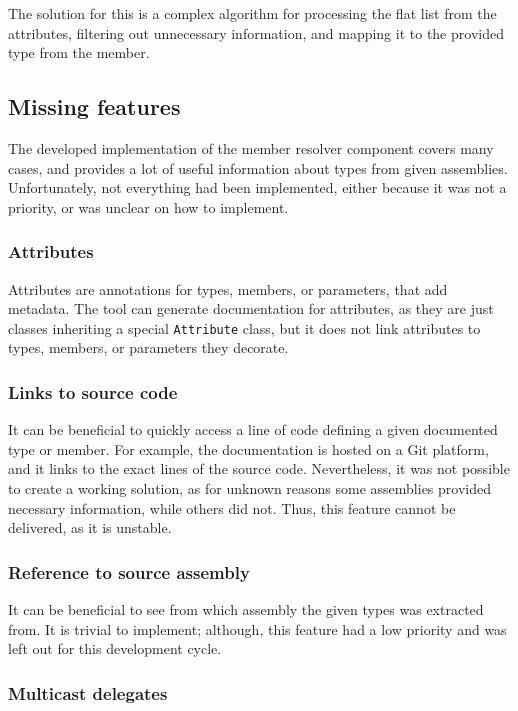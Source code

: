 The solution for this is a complex algorithm for processing the flat list from the attributes, filtering out unnecessary information, and mapping it to the provided type from the member.

\subsection{Missing features}

The developed implementation of the member resolver component covers many cases, and provides a lot of useful information about types from given assemblies. Unfortunately, not everything had been implemented, either because it was not a priority, or was unclear on how to implement.

\subsubsection{Attributes}

Attributes are annotations for types, members, or parameters, that add metadata. The tool can generate documentation for attributes, as they are just classes inheriting a special \lstinline[language=csh]{Attribute} class, but it does not link attributes to types, members, or parameters they decorate.

\subsubsection{Links to source code}

It can be beneficial to quickly access a line of code defining a given documented type or member. For example, the documentation is hosted on a Git platform, and it links to the exact lines of the source code. Nevertheless, it was not possible to create a working solution, as for unknown reasons some assemblies provided necessary information, while others did not. Thus, this feature cannot be delivered, as it is unstable.

\subsubsection{Reference to source assembly}

It can be beneficial to see from which assembly the given types was extracted from. It is trivial to implement; although, this feature had a low priority and was left out for this development cycle.

\subsubsection{Multicast delegates}

